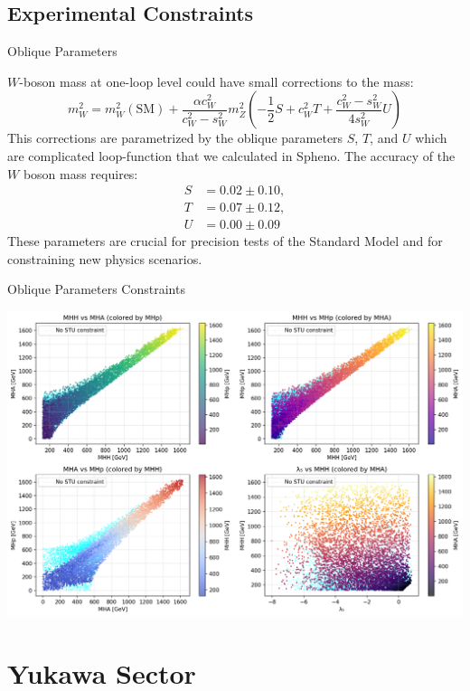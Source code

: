 \documentclass{../bredelebeamer}
\begin{document}
\subsection{Experimental Constraints}
\begin{frame}{Oblique Parameters}

  $W$-boson mass at one-loop level could have small corrections to the mass:
  $$
  m_W^2=m_W^2(\mathrm{SM})+\frac{\alpha c_W^2}{c_W^2-s_W^2} m_Z^2\left(-\frac{1}{2} S+c_W^2 T+\frac{c_W^2-s_W^2}{4 s_W^2} U\right)
  $$
  This corrections are parametrized by the oblique parameters $S$, $T$, and $U$ which are complicated loop-function that we calculated in Spheno.
  \vfill
  The accuracy of the $W$ boson mass requires:
    \begin{align}
      S & = 0.02 \pm 0.10, \\
      T & = 0.07 \pm 0.12, \\
      U & = 0.00 \pm 0.09
    \end{align}
  These parameters are crucial for precision tests of the Standard Model and for constraining new physics scenarios.
\end{frame}

\begin{frame}{Oblique Parameters Constraints}
  \begin{center}
    \includegraphics[width=\textwidth]{stu_THDM_param_scan_analysis}
  \end{center}
\end{frame}


\section{Yukawa Sector}
\end{document}
